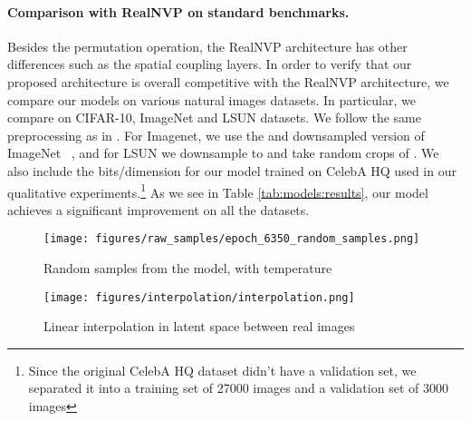 \documentclass{article}
\begin{document}
\paragraph{Comparison with RealNVP on standard benchmarks.}
\label{sec:exp_ll}
Besides the permutation operation, the RealNVP architecture has other differences such as the spatial coupling layers. In order to verify that our proposed architecture is overall competitive with the RealNVP architecture, we compare our models on various natural images datasets. In particular, we compare on CIFAR-10, ImageNet \citep{russakovsky2015imagenet} and LSUN \citep{yu15lsun} datasets. We follow the same preprocessing as in \citep{dinh2016density}. For Imagenet, we use the  and  downsampled version of ImageNet ~\citep{oord2016pixel}, and for LSUN we downsample to  and take random crops of . We also include the bits/dimension for our model trained on  CelebA HQ used in our qualitative experiments.\footnote{Since the original CelebA HQ dataset didn't have a validation set, we separated it into a training set of 27000 images and a validation set of 3000 images} As we see in Table \ref{tab:models:results}, our model achieves a significant improvement on all the datasets.

\begin{table}[]
    \centering
    \caption{Best results in bits per dimension of our model compared to RealNVP.}
    \label{tab:models:results}
\end{table}

\begin{figure}[t]
	\centering
	\texttt{[image: figures/raw\_samples/epoch\_6350\_random\_samples.png]}
	\caption{Random samples from the model, with temperature }
	\label{fig:samples}
\end{figure}
\begin{figure}[t]
	\centering
	\texttt{[image: figures/interpolation/interpolation.png]}
	\caption{Linear interpolation in latent space between real images}
	\label{fig:interpolation}
\end{figure}
\end{document}
